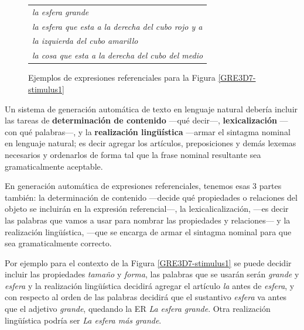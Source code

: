 \begin{figure}[!ht]
\begin{minipage}[t]{0.5\linewidth}
\begin{tabular}{l}
 {\it la esfera grande}\\

 {\it la esfera que esta a la derecha del cubo rojo y a }\\
{\it la izquierda del cubo amarillo}\\

 {\it la cosa que esta a la derecha del cubo del medio}\\

 \end{tabular}
\vspace*{0.5cm}
\caption{Ejemplos de expresiones referenciales para la Figura \ref{GRE3D7-stimulus1}}
 \label{er-figura1}
\end{minipage}
\end{figure}

Un sistema de generaci\'on autom\'atica de texto en lenguaje natural deber\'ia incluir 
las tareas de {\bf determinaci\'on de contenido} ---qu\'e decir---, {\bf lexicalizaci\'on} ---con qu\'e palabras---, y la {\bf realizaci\'on ling\"{u}\'istica} ---armar el sintagma nominal en lenguaje natural; es decir agregar los art\'iculos, preposiciones y dem\'as lexemas necesarios y ordenarlos de forma tal que la frase nominal resultante sea gramaticalmente aceptable. 

En generaci\'on autom\'atica de expresiones referenciales, tenemos esas 3 partes tambi\'en: la determinaci\'on de contenido ---decide qu\'e propiedades o relaciones del objeto se incluir\'an en la expresi\'on referencial---, la lexicalicalizaci\'on, ---es decir las palabras que vamos a usar para nombrar las propiedades y relaciones--- y la realizaci\'on ling\"u\'istica, ---que se encarga de armar el sintagma nominal para que sea gramaticalmente correcto.

Por ejemplo para el contexto de la Figura \ref{GRE3D7-stimulus1} se puede decidir incluir las propiedades {\it tama\~no} y {\it forma}, las palabras que se usar\'an ser\'an {\it grande} y {\it esfera} y la realizaci\'on ling\"u\'istica decidir\'a agregar el art\'iculo {\it la} antes de {\it esfera}, y con respecto al orden de las palabras decidir\'a que el sustantivo {\it esfera} va antes que el adjetivo {\it grande}, quedando la ER {\it La esfera grande}. Otra realizaci\'on ling\"u\'istica podr\'ia ser {\it La esfera m\'as grande}.
 


%



